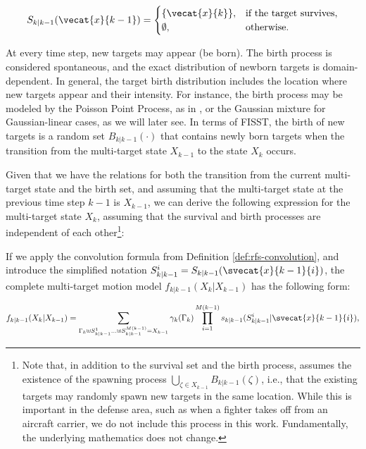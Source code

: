 \begin{equation}
    S_{k|k-1}(\vecat{x}{k-1}) = \begin{cases}
        \{\vecat{x}{k}\}, & \text{if the target survives}, \\
        \emptyset, & \text{otherwise}.
    \end{cases}
\end{equation}

At every time step, new targets may appear (be born). The birth process is considered spontaneous, and the exact distribution of newborn targets is domain-dependent. In general, the target birth distribution includes the location where new targets appear and their intensity. For instance, the birth process may be modeled by the Poisson Point Process, as in \cite{garcia-fernandezPoissonMultiBernoulliMixture2018}, or the Gaussian mixture for Gaussian-linear cases, as we will later see. In terms of FISST, the birth of new targets is a random set $B_{k|k-1}(\cdot)$ that contains newly born targets when the transition from the multi-target state $X_{k-1}$ to the state $X_{k}$ occurs.

Given that we have the relations for both the transition from the current multi-target state and the birth set, and assuming that the multi-target state at the previous time step $k-1$ is $X_{k-1}$, we can derive the following expression for the multi-target state $X_k$, assuming that the survival and birth processes are independent of each other\footnote{
Note that, in addition to the survival set and the birth process, \cite{voGaussianMixtureProbability2006} assumes the existence of the spawning process $\bigcup_{\zeta \in X_{k-1}} B_{k|k-1}(\zeta)$, i.e., that the existing targets may randomly spawn new targets in the same location. While this is important in the defense area, such as when a fighter takes off from an aircraft carrier, we do not include this process in this work. Fundamentally, the underlying mathematics does not change.}:

If we apply the convolution formula from Definition \ref{def:rfs-convolution}, and introduce the simplified notation $S_{k|k-1}^i = S_{k|k-1}(\svecat{x}{k-1}{i})$, the complete multi-target motion model $f_{k|k-1}(X_k | X_{k-1})$ has the following form:

\begin{equation}
    f_{k|k-1}(X_k | X_{k-1}) = 
    \sum_{
        \Gamma_k \uplus S_{k|k-1}^1 \ldots \uplus S_{k|k-1}^{M(k-1)} = X_{k-1}
    }
    \gamma_k(\Gamma_k)
    \prod_{i=1}^{M(k-1)}
    s_{k|k-1}(S_{k|k-1}^i | \svecat{x}{k-1}{i}),
\end{equation}

